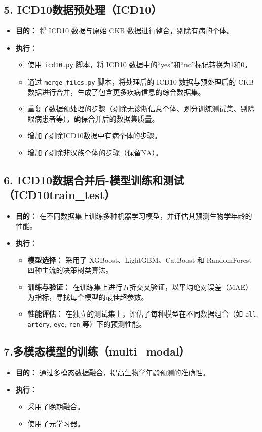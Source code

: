 \documentclass[UTF8]{report}
\theoremstyle{MyLineTheoremStyle} %
\theoremstyle{MyBlockTheoremStyle} %
\theoremstyle{MySubsubsectionStyle} %
\begin{document}
\subsection*{5. ICD10数据预处理（ICD10）}
\begin{itemize}
    \item \textbf{目的：} 将 ICD10 数据与原始 CKB 数据进行整合，剔除有病的个体。
    \item \textbf{执行：}
    \begin{itemize}
        \item 使用 \texttt{icd10.py} 脚本，将 ICD10 数据中的“yes”和“no”标记转换为1和0。
        \item 通过 \texttt{merge\_files.py} 脚本，将处理后的 ICD10 数据与预处理后的 CKB 数据进行合并，生成了包含更多疾病信息的综合数据集。
        \item 重复了数据预处理的步骤（剔除无诊断信息个体、划分训练测试集、剔除眼病患者等），确保合并后的数据集质量。
        \item 增加了剔除ICD10数据中有病个体的步骤。
        \item 增加了剔除非汉族个体的步骤（保留NA）。
    \end{itemize}
\end{itemize}


\subsection*{6. ICD10数据合并后-模型训练和测试（ICD10train\_test）}
\begin{itemize}
    \item \textbf{目的：} 在不同数据集上训练多种机器学习模型，并评估其预测生物学年龄的性能。
    \item \textbf{执行：}
    \begin{itemize}
        \item \textbf{模型选择：} 采用了 XGBoost、LightGBM、CatBoost 和 RandomForest 四种主流的决策树类算法。
        \item \textbf{训练与验证：} 在训练集上进行五折交叉验证，以平均绝对误差（MAE）为指标，寻找每个模型的最佳超参数。
        \item \textbf{性能评估：} 在独立的测试集上，评估了每种模型在不同数据组合（如 \texttt{all}, \texttt{artery}, \texttt{eye}, \texttt{ren} 等）下的预测性能。
    \end{itemize}
\end{itemize}


\subsection*{7.多模态模型的训练（multi\_modal）}
\begin{itemize}
    \item \textbf{目的：} 通过多模态数据融合，提高生物学年龄预测的准确性。
    \item \textbf{执行：}
    \begin{itemize}
        \item 采用了晚期融合。
        \item 使用了元学习器。
    \end{itemize}
\end{itemize}
\end{document}
